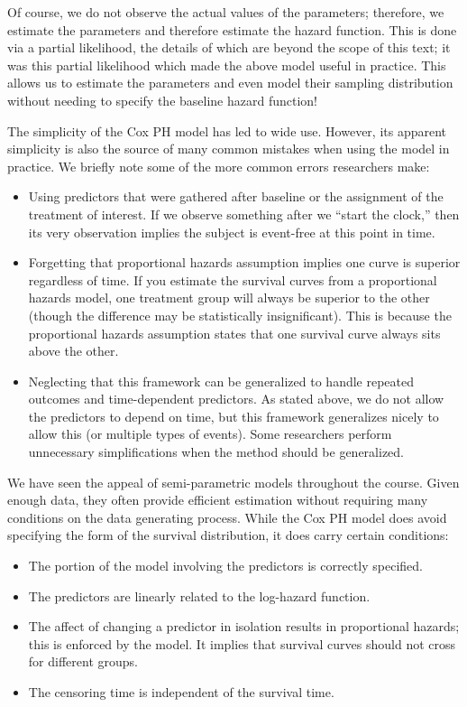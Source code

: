 \documentclass[
]{book}
\providecommand{\tightlist}{%
  \setlength{\itemsep}{0pt}\setlength{\parskip}{0pt}}
\theoremstyle{plain}
\theoremstyle{mydefn}
\theoremstyle{myexmpl}
\theoremstyle{remark}
\begin{document}
Of course, we do not observe the actual values of the parameters; therefore, we estimate the parameters and therefore estimate the hazard function. This is done via a partial likelihood, the details of which are beyond the scope of this text; it was this partial likelihood which made the above model useful in practice. This allows us to estimate the parameters and even model their sampling distribution without needing to specify the baseline hazard function!

The simplicity of the Cox PH model has led to wide use. However, its apparent simplicity is also the source of many common mistakes when using the model in practice. We briefly note some of the more common errors researchers make:

\begin{itemize}
\tightlist
\item
  Using predictors that were gathered after baseline or the assignment of the treatment of interest. If we observe something after we ``start the clock,'' then its very observation implies the subject is event-free at this point in time.
\item
  Forgetting that proportional hazards assumption implies one curve is superior regardless of time. If you estimate the survival curves from a proportional hazards model, one treatment group will always be superior to the other (though the difference may be statistically insignificant). This is because the proportional hazards assumption states that one survival curve always sits above the other.
\item
  Neglecting that this framework can be generalized to handle repeated outcomes and time-dependent predictors. As stated above, we do not allow the predictors to depend on time, but this framework generalizes nicely to allow this (or multiple types of events). Some researchers perform unnecessary simplifications when the method should be generalized.
\end{itemize}

We have seen the appeal of semi-parametric models throughout the course. Given enough data, they often provide efficient estimation without requiring many conditions on the data generating process. While the Cox PH model does avoid specifying the form of the survival distribution, it does carry certain conditions:

\begin{itemize}
\tightlist
\item
  The portion of the model involving the predictors is correctly specified.
\item
  The predictors are linearly related to the log-hazard function.
\item
  The affect of changing a predictor in isolation results in proportional hazards; this is enforced by the model. It implies that survival curves should not cross for different groups.
\item
  The censoring time is independent of the survival time.
\end{itemize}
\end{document}
